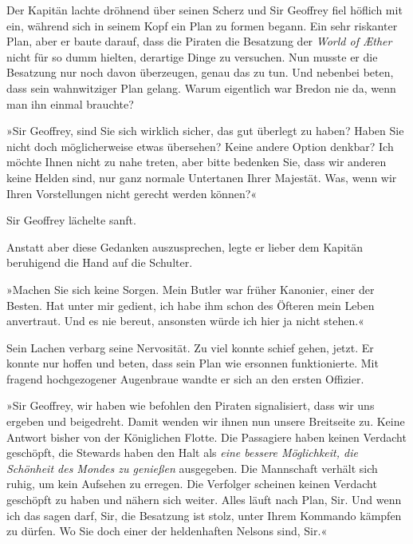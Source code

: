 Der Kapitän lachte dröhnend über seinen Scherz und Sir Geoffrey
fiel höflich mit ein, während sich in seinem Kopf ein Plan zu
formen begann. Ein sehr riskanter Plan, aber er baute darauf, dass
die Piraten die Besatzung der \textit{World of Æther} nicht für so dumm
hielten, derartige Dinge zu versuchen. Nun musste er die Besatzung
nur noch davon überzeugen, genau das zu tun. Und nebenbei beten,
dass sein wahnwitziger Plan gelang. Warum eigentlich war Bredon nie
da, wenn man ihn einmal brauchte?

\tb

»Sir Geoffrey, sind Sie sich wirklich sicher, das gut überlegt zu
haben? Haben Sie nicht doch möglicherweise etwas übersehen? Keine
andere Option denkbar? Ich möchte Ihnen nicht zu nahe treten, aber
bitte bedenken Sie, dass wir anderen keine Helden sind, nur ganz
normale Untertanen Ihrer Majestät. Was, wenn wir Ihren
Vorstellungen nicht gerecht werden können?«

\bigpar

Sir Geoffrey lächelte sanft.

 Anstatt aber diese Gedanken auszusprechen, legte er
lieber dem Kapitän beruhigend die Hand auf die Schulter.

»Machen Sie sich keine Sorgen. Mein Butler war früher Kanonier,
einer der Besten. Hat unter mir gedient, ich habe ihm schon des
Öfteren mein Leben anvertraut. Und es nie bereut, ansonsten würde
ich hier ja nicht stehen.«

Sein Lachen verbarg seine Nervosität. Zu viel konnte schief gehen,
jetzt. Er konnte nur hoffen und beten, dass sein Plan wie ersonnen
funktionierte. Mit fragend hochgezogener Augenbraue wandte er sich
an den ersten Offizier.

»Sir Geoffrey, wir haben wie befohlen den Piraten signalisiert,
dass wir uns ergeben und beigedreht. Damit wenden wir ihnen nun
unsere Breitseite zu. Keine Antwort bisher von der Königlichen
Flotte. Die Passagiere haben keinen Verdacht geschöpft, die
Stewards haben den Halt als \textit{eine bessere Möglichkeit, die Schönheit
des Mondes zu genießen} ausgegeben. Die Mannschaft verhält sich
ruhig, um kein Aufsehen zu erregen. Die Verfolger scheinen keinen
Verdacht geschöpft zu haben und nähern sich weiter. Alles läuft
nach Plan, Sir. Und wenn ich das sagen darf, Sir, die Besatzung ist
stolz, unter Ihrem Kommando kämpfen zu dürfen. Wo Sie doch einer
der heldenhaften Nelsons sind, Sir.«

